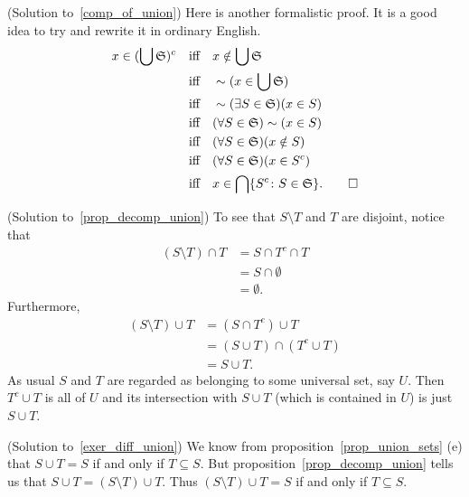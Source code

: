 \begin{prf}\label{sol_comp_of_union}(Solution to~\ref{comp_of_union})
 \nopagebreak
Here is another formalistic proof.  It is a good idea to try and rewrite it in
ordinary English.
 \begin{align*}
    x  \in  (\bigcup \mathfrak{S})^c  \quad
      &\text{iff} \quad  x \notin \bigcup \mathfrak{S}  \\
      &\text{iff} \quad  \sim (x \in \bigcup \mathfrak{S}) \\
      &\text{iff} \quad  \sim(\exists S \in \mathfrak{S})(x \in S) \\
      &\text{iff} \quad  (\forall S \in \mathfrak{S})\sim (x \in S) \\
      &\text{iff} \quad  (\forall S \in \mathfrak{S})(x \notin S) \\
      &\text{iff} \quad  (\forall S \in \mathfrak{S})(x \in S^c) \\
      &\text{iff} \quad  x \in \bigcap\{S^c\colon S \in \mathfrak{S}\}. \qedhere
 \end{align*}
\end{prf}

\begin{prf}\label{sol_prop_decomp_union}(Solution to~\ref{prop_decomp_union})
To see that  $S \setminus T$ and $T$ are disjoint, notice that
  \begin{align*}
     (S \setminus T) \cap T  &= S \cap T^c \cap T  \\
                             &= S \cap \emptyset  \\
                             &= \emptyset.
  \end{align*}
Furthermore,
  \begin{align*}
     (S \setminus T) \cup T  &=  (S \cap T^c ) \cup T \\
                             &=  (S \cup T) \cap (T^c \cup T) \\
                             &=  S \cup T.
  \end{align*}
As usual $S$ and $T$ are regarded as belonging to some universal set, say $U$. Then $T^c \cup
T$ is all of $U$ and its intersection with $S \cup T$ (which is contained in $U$) is just $S \cup T$.
\end{prf}

\begin{prf}\label{sol_exer_diff_union}(Solution to~\ref{exer_diff_union})
We know from proposition~\ref{prop_union_sets} (e) that $S \cup T  =  S$ if and only if $T
\subseteq S$.  But proposition~\ref{prop_decomp_union} tells us that $S \cup T = (S \setminus
T) \cup T$.  Thus $(S \setminus T) \cup T  =  S$ if and only if $T \subseteq S$.
\end{prf}





